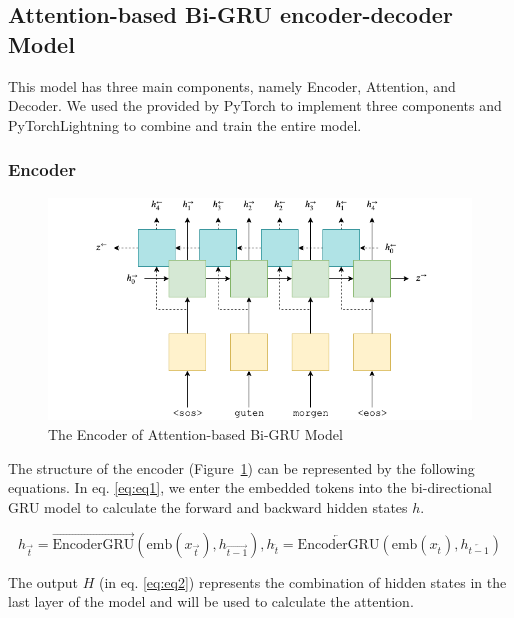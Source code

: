 \subsection{Attention-based Bi-GRU encoder-decoder Model} \label{sec:rnn}

This model has three main components, namely Encoder, Attention, and Decoder. We used the  provided by PyTorch to implement three components and PyTorchLightning to combine and train the entire model.

\subsubsection{Encoder}

\begin{figure}[H]
	\centering
	\includegraphics[scale=0.7]{../images/bi_encoder.png}
    \caption{The Encoder of Attention-based Bi-GRU Model}
	\label{fig:seq2seq_encoder}
\end{figure}

The structure of the encoder (Figure~\ref{fig:seq2seq_encoder}) can be represented by the following equations. In eq. \ref{eq:eq1}, we enter the embedded tokens into the bi-directional GRU model to calculate the forward and backward hidden states $h$. 

\begin{equation}
    h_{\overrightarrow{t}} = \overrightarrow{\text{EncoderGRU}}(\text{emb}(x_{\overrightarrow{t}}), h_{\overrightarrow{t-1}}), 
    h_{\overleftarrow{t}} = \overleftarrow{\text{EncoderGRU}}(\text{emb}(x_{\overleftarrow{t}}), h_{\overleftarrow{t-1}})
    \label{eq:eq1}
\end{equation}

The output $H$ (in eq. \ref{eq:eq2}) represents the combination of hidden states in the last layer of the model and will be used to calculate the attention. 

